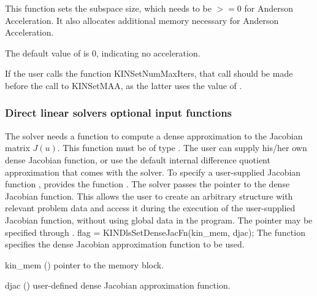 {
  This function sets the subspace size, which needs to be $>= 0$ for Anderson
  Acceleration.  It also allocates additional memory necessary for Anderson Acceleration.

  The default value of  is 0, indicating no acceleration.

  If the user calls the function KINSetNumMaxIters, that call should be made
  before the call to KINSetMAA, as the latter uses the value of . 
}

\subsubsection{Direct linear solvers optional input functions}\label{sss:optin_dls}
The 
{\kindense} solver needs a function to compute a dense approximation to
the Jacobian matrix $J(u)$.  This function must be of type . 
The user can supply his/her own dense Jacobian function, or use the default 
internal difference quotient approximation
that comes with the {\kindense} solver.
To specify a user-supplied Jacobian function , {\kindense} 
provides the function .
The {\kindense} solver passes the pointer  
to the dense Jacobian function. This allows the user to
create an arbitrary structure with relevant problem data and access it
during the execution of the user-supplied Jacobian function, without
using global data in the program.  The pointer  may be
specified through .
{
  flag = KINDlsSetDenseJacFn(kin\_mem, djac);
}
{
  The function  specifies the dense Jacobian
  approximation function to be used.
}
{
  \begin{args}
  \item[kin\_mem] ()
    pointer to the {\kinsol} memory block.
  \item[djac] ()
    user-defined dense Jacobian approximation function.
  \end{args}
}
